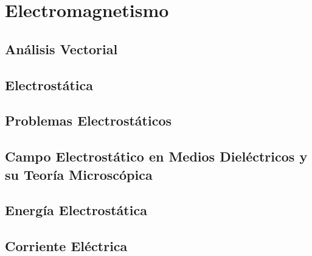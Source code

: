 \part{Electromagnetismo}

\chapter{Análisis Vectorial}








\chapter{Electrostática}











\chapter{Problemas Electrostáticos}












\chapter{Campo Electrostático en Medios Dieléctricos y su Teoría Microscópica}










\chapter{Energía Electrostática}







\chapter{Corriente Eléctrica}








